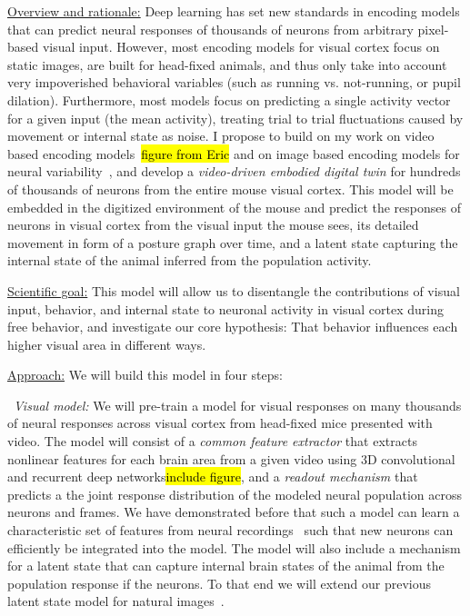 \documentclass[COG,11pt]{ercgrant}
\begin{document}
\underline{Overview and rationale:}
Deep learning has set new standards in encoding models that can predict neural responses of thousands of neurons from arbitrary pixel-based visual input. However, most encoding models for visual cortex focus on static images, are built for head-fixed animals, and thus only take into account very impoverished behavioral variables (such as running vs. not-running, or pupil dilation). 
Furthermore, most models focus on predicting a single activity vector for a given input (the mean activity), treating trial to trial fluctuations caused by movement or internal state as noise. 
I propose to build on my work on video based encoding models~\parencite{Sinz2018-sk}\hl{figure from Eric} and on image based encoding models for neural variability~\parencite{Bashiri2021-or}, and develop a \emph{video-driven embodied digital twin} for hundreds of thousands of neurons from the entire mouse visual cortex.
This model will be embedded in the digitized environment of the mouse and predict the responses of neurons in visual cortex from the visual input the mouse sees, its detailed movement in form of a posture graph over time, and a latent state capturing the internal state of the animal inferred from the population activity. 

\underline{Scientific goal:} This model will allow us to disentangle the contributions of visual input, behavior, and internal state to neuronal activity in visual cortex during free behavior, and investigate our core hypothesis: That behavior influences each higher visual area in different ways. 

\underline{Approach:} We will build this model in four steps:

~\textit{Visual model:} We will pre-train a model for visual responses on many thousands of neural responses across visual cortex from head-fixed mice presented with video. 
The model will consist of a \textit{common feature extractor} that extracts nonlinear features for each brain area from a given video using 3D convolutional and recurrent deep networks\hl{include figure}, and a \textit{readout mechanism} that predicts a the joint response distribution of the modeled neural population across neurons and frames.
We have demonstrated before that such a model can learn a characteristic set of features from neural recordings~\parencite{Lurz2020-ua} such that new neurons can efficiently be integrated into the model. 
The model will also include a mechanism for a latent state that can capture internal brain states of the animal from the population response if the neurons.
To that end we will extend our previous latent state model for natural images~\parencite{Bashiri2021-or}.
\end{document}
